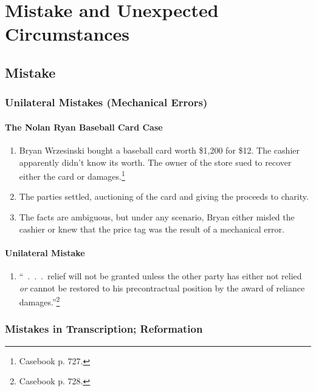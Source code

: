 \section{Mistake and Unexpected Circumstances}

\subsection{Mistake}

\subsubsection{Unilateral Mistakes (Mechanical Errors)}

\paragraph{The Nolan Ryan Baseball Card Case}

\begin{enumerate}
    \item Bryan Wrzesinski bought a baseball card worth \$1,200 for \$12. The 
    cashier apparently didn't know its worth. The owner of the store sued to 
    recover either the card or damages.\footnote{Casebook p. 727.}
    \item The parties settled, auctioning of the card and giving the proceeds 
    to charity.
    \item The facts are ambiguous, but under any scenario, Bryan either misled 
    the cashier or knew that the price tag was the result of a mechanical 
    error.
\end{enumerate}

\paragraph{Unilateral Mistake}

\begin{enumerate}
    \item ``~.~.~.~relief will not be granted unless the other party has 
    either not relied \emph{or} cannot be restored to his precontractual 
    position by the award of reliance damages.''\footnote{Casebook p. 728.}
\end{enumerate}

\subsubsection{Mistakes in Transcription; Reformation}


